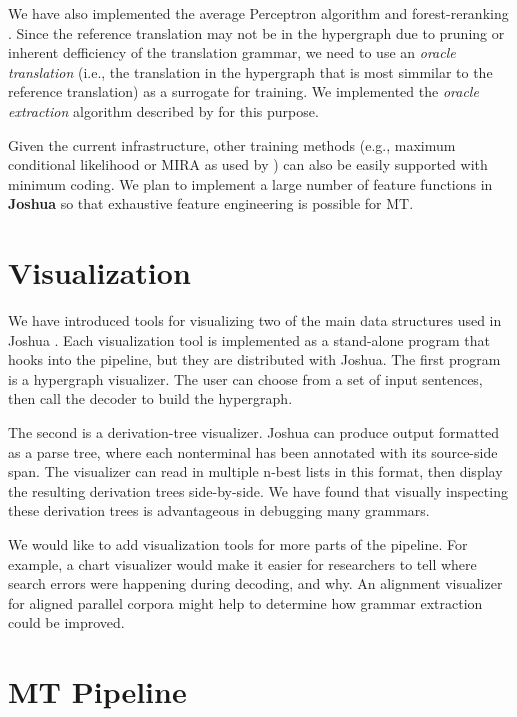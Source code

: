 \documentclass[11pt]{article}
\newcommand{\joshua}{\textbf{Joshua}\xspace}
\begin{document}
We have also implemented the average Perceptron algorithm and forest-reranking \cite{zhifei-forest-reranking-galebook}.
Since the reference translation may not be in the hypergraph due to pruning or inherent
defficiency of the translation grammar, we need to use an {\em oracle translation} (i.e., the translation in
the hypergraph that is most simmilar to the reference translation) as a surrogate for training.
We implemented the {\em oracle extraction} algorithm described by 
for this purpose.

Given the current infrastructure, other training methods 
(e.g., maximum conditional likelihood or MIRA as used by )
can also be easily supported with minimum coding.
We plan to implement a large number of feature functions in \joshua so that exhaustive 
feature engineering is possible for MT.

\section{Visualization}

We have introduced tools for visualizing two of the main data structures used
in Joshua \cite{PBML-2010-Joshua-visualization}. Each visualization tool is implemented as a
stand-alone program that hooks into the pipeline, but they are distributed with
Joshua. The first program is a hypergraph visualizer. The user can choose from
a set of input sentences, then call the decoder to build the hypergraph.

The second is a derivation-tree visualizer. Joshua can produce output formatted
as a parse tree, where each nonterminal has been annotated with its source-side
span. The visualizer can read in multiple n-best lists in this format, then
display the resulting derivation trees side-by-side. We have found that
visually inspecting these derivation trees is advantageous in debugging many
grammars.

We would like to add visualization tools for more parts of the pipeline. For
example, a chart visualizer would make it easier for researchers to tell where
search errors were happening during decoding, and why. An alignment visualizer
for aligned parallel corpora might help to determine how grammar extraction 
could be improved.


\section{MT Pipeline}
\end{document}
